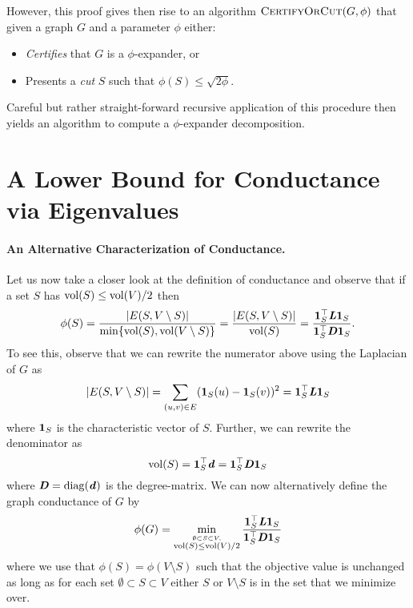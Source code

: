 However, this proof gives then rise to an algorithm $\textsc{CertifyOrCut}(G, \phi)$ that given a graph $G$ and a parameter $\phi$ either: 
\begin{itemize}
    \item \emph{Certifies} that $G$ is a $\phi$-expander, or
    \item Presents a \emph{cut} $S$ such that $\phi(S) \leq \sqrt{2\phi}$.
\end{itemize}
Careful but rather straight-forward recursive application of this procedure then yields an algorithm to compute a $\phi$-expander decomposition. 

\section{A Lower Bound for Conductance via Eigenvalues}

\paragraph{An Alternative Characterization of Conductance.} Let us now take a closer look at the definition of conductance and observe that if a set $S$ has $\operatorname{vol}(S) \leq \operatorname{vol}(V)/2$ then
\[
\phi(S) = \frac{|E(S, V \setminus S)|}{ \min\{\operatorname{vol}(S), \operatorname{vol}(V \setminus S)\} } = \frac{|E(S, V \setminus S)|}{ \operatorname{vol}(S) } = \frac{\boldsymbol{1}_S^\top \boldsymbol{\mathit{L}} \boldsymbol{1}_S}{\boldsymbol{1}_S^\top \boldsymbol{\mathit{D}} \boldsymbol{1}_S}.
\]
To see this, observe that we can rewrite the numerator above using the Laplacian of $G$ as
\[
|E(S, V \setminus S)| = \sum_{(u,v)\in E} (\boldsymbol{1}_S(u) - \boldsymbol{1}_S(v))^2 =  \boldsymbol{1}_S^\top \boldsymbol{\mathit{L}} \boldsymbol{1}_S
\]
where $\boldsymbol{1}_S$ is the characteristic vector of $S$. Further, we can rewrite the denominator as 
\[
\operatorname{vol}(S) = \boldsymbol{1}_S^\top \boldsymbol{\mathit{d}} = \boldsymbol{1}_S^\top \boldsymbol{\mathit{D}} \boldsymbol{1}_S
\]
where $\boldsymbol{\mathit{D}} = \operatorname*{diag}(\boldsymbol{\mathit{d}})$ is the degree-matrix. We can now alternatively define the graph conductance of $G$ by
\begin{equation}\label{eq:conductanceAltDef}
\phi(G) = \min_{\stackrel{\emptyset \subset S \subset V,} {\operatorname{vol}(S) \leq \operatorname{vol}(V)/2}} \frac{\boldsymbol{1}_S^\top \boldsymbol{\mathit{L}} \boldsymbol{1}_S}{\boldsymbol{1}_S^\top \boldsymbol{\mathit{D}} \boldsymbol{1}_S} 
\end{equation}
where we use that $\phi(S) = \phi(V \setminus S)$ such that the objective value is unchanged as long as for each set $\emptyset \subset S \subset V$ either $S$ or $V \setminus S$ is in the set that we minimize over.

